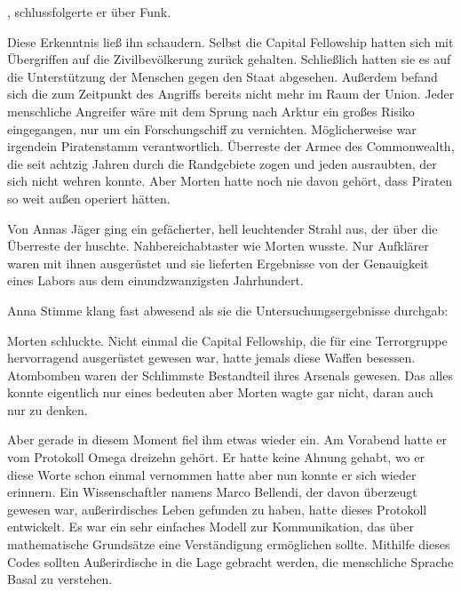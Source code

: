 \par

, schlussfolgerte er über Funk.

\par

Diese Erkenntnis ließ ihn schaudern. Selbst die Capital Fellowship hatten sich mit Übergriffen auf die Zivilbevölkerung zurück gehalten. Schließlich hatten sie es auf die Unterstützung der Menschen gegen den Staat abgesehen. Außerdem befand sich die  zum Zeitpunkt des Angriffs bereits nicht mehr im Raum der Union. Jeder menschliche Angreifer wäre mit dem Sprung nach Arktur ein großes Risiko eingegangen, nur um ein Forschungschiff zu vernichten. Möglicherweise war irgendein Piratenstamm verantwortlich. Überreste der Armee des Commonwealth, die seit achtzig Jahren durch die Randgebiete zogen und jeden ausraubten, der sich nicht wehren konnte. Aber Morten hatte noch nie davon gehört, dass Piraten so weit außen operiert hätten.

\par

Von Annas Jäger ging ein gefächerter, hell leuchtender Strahl aus, der über die Überreste der  huschte. Nahbereichabtaster wie Morten wusste. Nur Aufklärer waren mit ihnen ausgerüstet und sie lieferten Ergebnisse von der Genauigkeit eines Labors aus dem einundzwanzigsten Jahrhundert.

\par

Anna Stimme klang fast abwesend als sie die Untersuchungsergebnisse durchgab: 

\par

Morten schluckte. Nicht einmal die Capital Fellowship, die für eine Terrorgruppe hervorragend ausgerüstet gewesen war, hatte jemals diese Waffen besessen. Atombomben waren der Schlimmste Bestandteil ihres Arsenals gewesen. Das alles konnte eigentlich nur eines bedeuten aber Morten wagte gar nicht, daran auch nur zu denken.

\par

Aber gerade in diesem Moment fiel ihm etwas wieder ein. Am Vorabend hatte er vom Protokoll Omega dreizehn gehört. Er hatte keine Ahnung gehabt, wo er diese Worte schon einmal vernommen hatte aber nun konnte er sich wieder erinnern. Ein Wissenschaftler namens Marco Bellendi, der davon überzeugt gewesen war, außerirdisches Leben gefunden zu haben, hatte dieses Protokoll entwickelt. Es war ein sehr einfaches Modell zur Kommunikation, das über mathematische Grundsätze eine Verständigung ermöglichen sollte. Mithilfe dieses Codes sollten Außerirdische in die Lage gebracht werden, die menschliche Sprache Basal zu verstehen.

